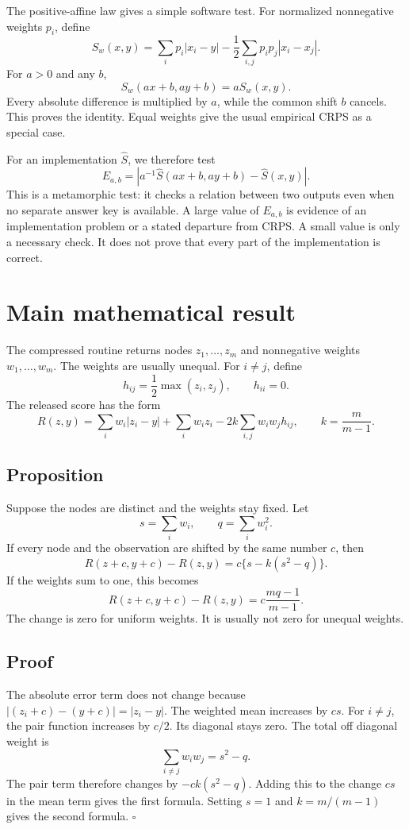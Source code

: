 \documentclass[11pt]{article}
\begin{document}
The positive-affine law gives a simple software test. For normalized nonnegative weights $p_i$, define
\[
S_w(x,y)=\sum_i p_i|x_i-y|-\frac12\sum_{i,j}p_ip_j|x_i-x_j|.
\]
For $a>0$ and any $b$,
\[
S_w(ax+b,ay+b)=aS_w(x,y).
\]
Every absolute difference is multiplied by $a$, while the common shift $b$ cancels. This proves the identity. Equal weights give the usual empirical CRPS as a special case.

For an implementation $\widehat S$, we therefore test
\[
E_{a,b}=\left|a^{-1}\widehat S(ax+b,ay+b)-\widehat S(x,y)\right|.
\]
This is a metamorphic test: it checks a relation between two outputs even when no separate answer key is available. A large value of $E_{a,b}$ is evidence of an implementation problem or a stated departure from CRPS. A small value is only a necessary check. It does not prove that every part of the implementation is correct.

\section{Main mathematical result}

The compressed routine returns nodes $z_1,\ldots,z_m$ and nonnegative weights $w_1,\ldots,w_m$. The weights are usually unequal. For $i\ne j$, define
\[
h_{ij}=\frac{1}{2}\max(z_i,z_j),
\qquad h_{ii}=0.
\]
The released score has the form
\[
R(z,y)=\sum_i w_i|z_i-y|+\sum_i w_i z_i
-2k\sum_{i,j}w_iw_jh_{ij},
\qquad k=\frac{m}{m-1}.
\]

\subsection*{Proposition}
Suppose the nodes are distinct and the weights stay fixed. Let
\[
s=\sum_i w_i,
\qquad q=\sum_i w_i^2.
\]
If every node and the observation are shifted by the same number $c$, then
\[
R(z+c,y+c)-R(z,y)=c\{s-k(s^2-q)\}.
\]
If the weights sum to one, this becomes
\[
R(z+c,y+c)-R(z,y)
=c\frac{mq-1}{m-1}.
\]
The change is zero for uniform weights. It is usually not zero for unequal weights.

\subsection*{Proof}
The absolute error term does not change because
$|(z_i+c)-(y+c)|=|z_i-y|$. The weighted mean increases by $cs$. For $i\ne j$, the pair function increases by $c/2$. Its diagonal stays zero. The total off diagonal weight is
\[
\sum_{i\ne j}w_iw_j=s^2-q.
\]
The pair term therefore changes by $-ck(s^2-q)$. Adding this to the change $cs$ in the mean term gives the first formula. Setting $s=1$ and $k=m/(m-1)$ gives the second formula. \hfill$\square$
\end{document}
